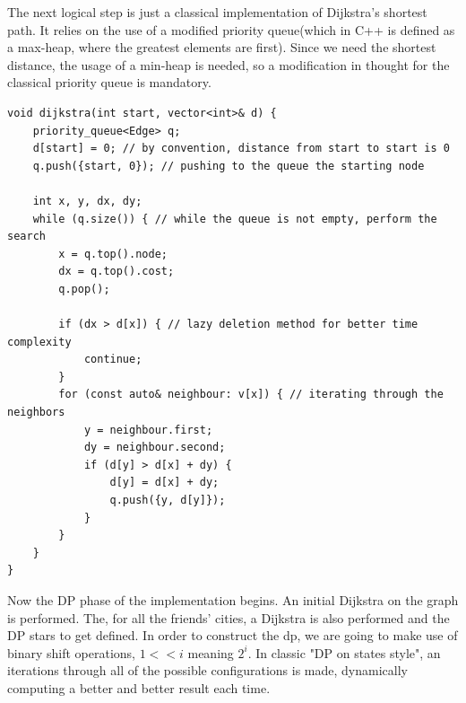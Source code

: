\documentclass[letterpaper]{article}
\begin{document}
The next logical step is just a classical implementation of Dijkstra's shortest path. It relies on the use of a modified priority queue(which in C++ is defined as a max-heap, where the greatest elements are first). Since we need the shortest distance, the usage of a min-heap is needed, so a modification in thought for the classical priority queue is mandatory.

\begin{lstlisting}
void dijkstra(int start, vector<int>& d) {
    priority_queue<Edge> q;
    d[start] = 0; // by convention, distance from start to start is 0
    q.push({start, 0}); // pushing to the queue the starting node

    int x, y, dx, dy;
    while (q.size()) { // while the queue is not empty, perform the search
        x = q.top().node;
        dx = q.top().cost;
        q.pop();

        if (dx > d[x]) { // lazy deletion method for better time complexity
            continue;
        }
        for (const auto& neighbour: v[x]) { // iterating through the neighbors 
            y = neighbour.first;
            dy = neighbour.second;
            if (d[y] > d[x] + dy) {
                d[y] = d[x] + dy;
                q.push({y, d[y]});
            }
        }
    }
}
\end{lstlisting}

Now the DP phase of the implementation begins. An initial Dijkstra on the graph is performed. The, for all the friends' cities, a Dijkstra is also performed and the DP stars to get defined. In order to construct the dp, we are going to make use of binary shift operations, $1<<i$ meaning $2^{i}$. In classic "DP on states style", an iterations through all of the possible configurations is made, dynamically computing a better and better result each time.
\end{document}
